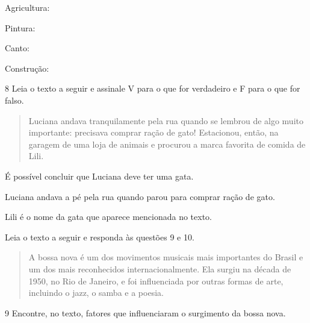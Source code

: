 \begin{escolha}
\item Agricultura: 

\item Pintura: 

\item Canto: 

\item Construção: 
\end{escolha}

\num{8} Leia o texto a seguir e assinale V para o que for verdadeiro e F para o que for falso.

\begin{quote}
Luciana andava tranquilamente pela rua quando se lembrou de algo muito
importante: precisava comprar ração de gato! Estacionou, então, na
garagem de uma loja de animais e procurou a marca favorita de comida de
Lili.

\end{quote}

\begin{boxlist}
 É possível concluir que Luciana deve ter uma gata.

 Luciana andava a pé pela rua quando parou para comprar ração de gato.

 Lili é o nome da gata que aparece mencionada no texto.
\end{boxlist}


Leia o texto a seguir e responda às questões 9 e 10.

\begin{quote}
A bossa nova é um dos movimentos musicais mais importantes do Brasil e
um dos mais reconhecidos internacionalmente. Ela surgiu na década de
1950, no Rio de Janeiro, e foi influenciada por outras formas de arte,
incluindo o jazz, o samba e a poesia.

\end{quote}

\num{9} Encontre, no texto, fatores que influenciaram o surgimento da bossa nova.



